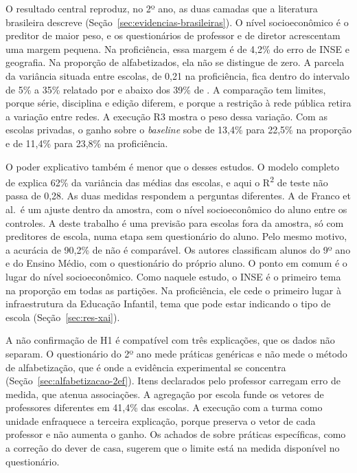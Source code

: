 O resultado central reproduz, no 2º ano, as duas camadas que a literatura
brasileira descreve (Seção~\ref{sec:evidencias-brasileiras}). O nível
socioeconômico é o preditor de maior peso, e os questionários de professor
e de diretor acrescentam uma margem pequena. Na proficiência, essa margem é
de 4,2\% do erro de INSE e geografia. Na proporção de alfabetizados, ela
não se distingue de zero. A parcela da variância situada entre escolas,
de 0,21 na proficiência, fica dentro do intervalo de 5\% a 35\% relatado
por  e abaixo dos 39\% de
. A comparação tem limites, porque
série, disciplina e edição diferem, e porque a restrição à rede pública
retira a variação entre redes. A execução R3 mostra o peso dessa variação.
Com as escolas privadas, o ganho sobre o \textit{baseline} sobe de 13,4\%
para 22,5\% na proporção e de 11,4\% para 23,8\% na proficiência.

O poder explicativo também é menor que o desses estudos. O modelo completo
de  explica 62\% da variância das
médias das escolas, e aqui o R\textsuperscript{2} de teste não passa de 0,28. As duas
medidas respondem a perguntas diferentes. A de Franco et al.\ é um ajuste
dentro da amostra, com o nível socioeconômico do aluno entre os controles.
A deste trabalho é uma previsão para escolas fora da amostra, só com
preditores de escola, numa etapa sem questionário do aluno. Pelo mesmo
motivo, a acurácia de 90,2\% de  não é
comparável. Os autores classificam alunos do 9º ano e do Ensino Médio, com
o questionário do próprio aluno. O ponto em comum é o lugar do nível
socioeconômico. Como naquele estudo, o INSE é o primeiro tema na proporção
em todas as partições. Na proficiência, ele cede o primeiro lugar à
infraestrutura da Educação Infantil, tema que pode estar indicando o tipo
de escola (Seção~\ref{sec:res-xai}).

A não confirmação de H1 é compatível com três explicações, que os dados
não separam. O questionário do 2º ano mede práticas genéricas e não mede o
método de alfabetização, que é onde a evidência experimental se concentra
(Seção~\ref{sec:alfabetizacao-2ef}). Itens declarados pelo professor
carregam erro de medida, que atenua associações. A agregação por escola
funde os vetores de professores diferentes em 41,4\% das escolas. A
execução com a turma como unidade enfraquece a terceira explicação, porque
preserva o vetor de cada professor e não aumenta o ganho. Os achados de
 sobre práticas específicas, como a
correção do dever de casa, sugerem que o limite está na medida disponível
no questionário.

